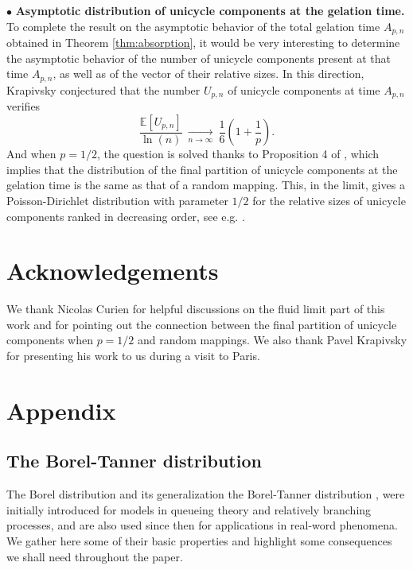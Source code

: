 \documentclass[a4, 11pt]{article}
\numberwithin{equation}{section}
\theoremstyle{plain}
\theoremstyle{definition}
\theoremstyle{remark}
\begin{document}
$\bullet$ \textbf{Asymptotic distribution of unicycle components at the gelation time.} To complete the result on the asymptotic behavior of the total gelation time $A_{p,n}$ obtained in Theorem \ref{thm:absorption}, it would be very interesting to determine the asymptotic behavior of the number of unicycle components present at that time $A_{p,n}$, as well as of the vector of their relative sizes. In this direction, Krapivsky \cite{krapisvky24} conjectured that the number $U_{p,n}$ of unicycle components at  time $A_{p,n}$ verifies
\begin{equation*}
	\frac{\mathbb E\left[U_{p,n}\right]}{\ln(n)} ~ \underset{n \rightarrow \infty}{\longrightarrow}~  \frac{1}{6}\left(1+\frac{1}{p}\right).
\end{equation*} 
And when $p=1/2$, the question is solved thanks to Proposition 4 of \cite{ContatCurien23}, which implies that the distribution of the final partition of unicycle components at the gelation time is the same as that of a random mapping. This, in the limit, gives a Poisson-Dirichlet distribution with parameter $1/2$ for the relative sizes of unicycle components ranked in decreasing order, see e.g. \cite{AldousexchSF}.  



\section*{Acknowledgements}
We thank Nicolas Curien for helpful discussions on the fluid limit part of this work and for pointing out the connection between the final partition of unicycle components when $p=1/2$ and random mappings. We also thank Pavel Krapivsky for presenting his work \cite{krapisvky24} to us during a visit to Paris.

\appendix 
\section{Appendix}
\label{sec:app}

\subsection{The Borel-Tanner distribution}
\label{app:BT}

The Borel distribution and its generalization the Borel-Tanner distribution \cite{Borel42},\cite{Tanner61} were initially introduced for models in queueing theory and relatively branching processes, and are also used since then for applications in real-word phenomena. We gather here some of their basic properties and highlight some consequences we shall need throughout the paper.
\end{document}
